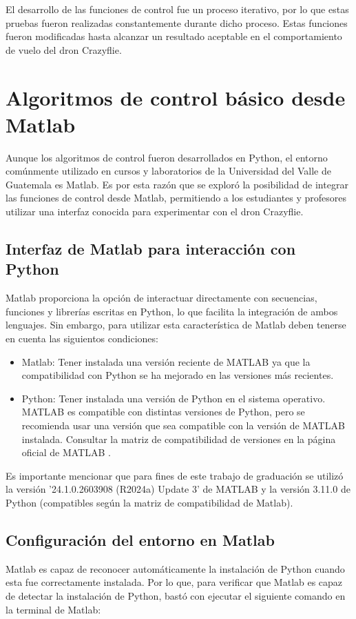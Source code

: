 El desarrollo de las funciones de control fue un proceso iterativo, por lo que estas pruebas fueron realizadas constantemente durante dicho proceso. Estas funciones fueron modificadas hasta alcanzar un resultado aceptable en el comportamiento de vuelo del dron Crazyflie.

\newpage
\section{Algoritmos de control básico desde Matlab}
Aunque los algoritmos de control fueron desarrollados en Python, el entorno comúnmente utilizado en cursos y laboratorios de la Universidad del Valle de Guatemala es Matlab. Es por esta razón que se exploró la posibilidad de integrar las funciones de control desde Matlab, permitiendo a los estudiantes y profesores utilizar una interfaz conocida para experimentar con el dron Crazyflie.

\subsection{Interfaz de Matlab para interacción con Python}
Matlab proporciona la opción de interactuar directamente con secuencias, funciones y librerías escritas en Python, lo que facilita la integración de ambos lenguajes. Sin embargo, para utilizar esta característica de Matlab deben tenerse en cuenta las siguientos condiciones:

\begin{itemize}
	\item Matlab: Tener instalada una versión reciente de MATLAB ya que la compatibilidad con Python se ha mejorado en las versiones más recientes.
	\item Python: Tener instalada una versión de Python en el sistema operativo. MATLAB es compatible con distintas versiones de Python, pero se recomienda usar una versión que sea compatible con la versión de MATLAB instalada. Consultar la matriz de compatibilidad de versiones en la página oficial de MATLAB \cite{Matlab_Python_compability}.
\end{itemize}

Es importante mencionar que para fines de este trabajo de graduación se utilizó la versión '24.1.0.2603908 (R2024a) Update 3' de MATLAB y la versión 3.11.0 de Python (compatibles según la matriz de compatibilidad de Matlab).

\subsection{Configuración del entorno en Matlab}
Matlab es capaz de reconocer automáticamente la instalación de Python cuando esta fue correctamente instalada. Por lo que, para verificar que Matlab es capaz de detectar la instalación de Python, bastó con ejecutar el siguiente comando en la terminal de Matlab:

